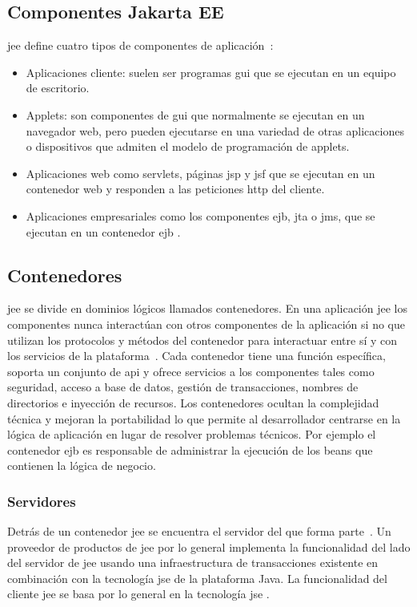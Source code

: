 \subsection{Componentes Jakarta EE}
\label{sec:componentes}
\acrshort{jee} define cuatro tipos de componentes de aplicación~\cite{JakartaEE}:
\begin{itemize}
   \item Aplicaciones cliente: suelen ser programas \acrfull{gui} que se ejecutan en un equipo de escritorio.
   \item Applets: son componentes de \acrshort{gui} que normalmente se ejecutan en un navegador web, pero pueden ejecutarse en una variedad de otras aplicaciones o dispositivos que admiten el modelo de programación de applets. 
   \item Aplicaciones web como servlets, páginas \acrfull{jsp} y \acrshort{jsf} que se ejecutan en un contenedor web y responden a las peticiones \acrshort{http} del cliente.
   \item Aplicaciones empresariales como los componentes \acrshort{ejb}, \acrshort{jta} o \acrshort{jms}, que se ejecutan en un contenedor \acrshort{ejb} .
\end{itemize}



\subsection{Contenedores}
\label{sec:contenedores}
\acrshort{jee} se divide en dominios lógicos llamados contenedores. En una aplicación \acrshort{jee} los componentes nunca interactúan con otros componentes de la aplicación si no que utilizan los protocolos y métodos del contenedor para interactuar entre sí y con los servicios de la plataforma~\cite{JakartaEE}. Cada contenedor tiene una función específica, soporta un conjunto de \acrshort{api} y ofrece servicios a los componentes tales como seguridad, acceso a base de datos, gestión de transacciones, nombres de directorios e inyección de recursos. Los contenedores ocultan la complejidad técnica y mejoran la portabilidad lo que permite al desarrollador centrarse en la lógica de aplicación en lugar de resolver problemas técnicos. Por ejemplo el contenedor \acrshort{ejb} es responsable de administrar la ejecución de los beans que contienen la lógica de negocio.

\subsubsection{Servidores}
\label{sec:servidores}
Detrás de un contenedor \acrshort{jee} se encuentra el servidor del que forma parte~\cite{JakartaEE}. Un proveedor de productos de \acrshort{jee}  por lo general implementa la funcionalidad del lado del servidor de \acrshort{jee}  usando una infraestructura de transacciones existente en combinación con la tecnología \acrshort{jse} de la plataforma Java. La funcionalidad del cliente \acrshort{jee} se basa por lo general en la tecnología \acrshort{jse} .




